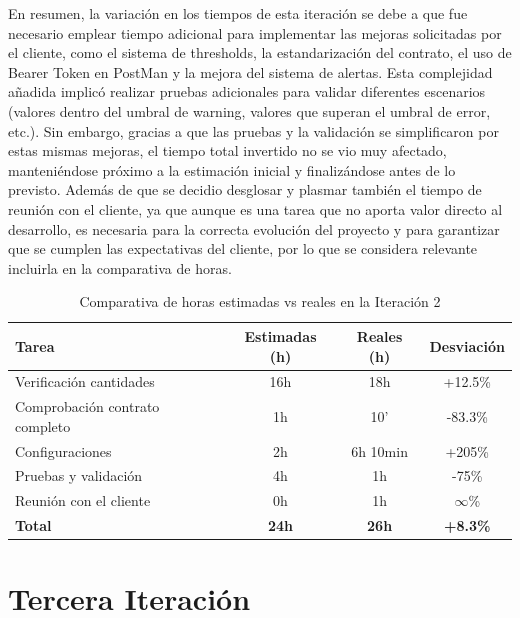 En resumen, la variación en los tiempos de esta iteración se debe a que fue necesario emplear tiempo adicional para implementar las mejoras solicitadas por el cliente, como el sistema de thresholds, la estandarización del contrato, el uso de Bearer Token en PostMan y la mejora del sistema de alertas. Esta complejidad añadida implicó realizar pruebas adicionales para validar diferentes escenarios (valores dentro del umbral de warning, valores que superan el umbral de error, etc.). Sin embargo, gracias a que las pruebas y la validación se simplificaron por estas mismas mejoras, el tiempo total invertido no se vio muy afectado, manteniéndose próximo a la estimación inicial y finalizándose antes de lo previsto.
Además de que se decidio desglosar y plasmar también el tiempo de reunión con el cliente, ya que aunque es una tarea que no aporta valor directo al desarrollo, es necesaria para la correcta evolución del proyecto y para garantizar que se cumplen las expectativas del cliente, por lo que se considera relevante incluirla en la comparativa de horas.

\begin{table}[H]
    \centering
    \begin{tabular}{|l|c|c|c|}
        \hline
        \textbf{Tarea} & \textbf{Estimadas (h)} & \textbf{Reales (h)} & \textbf{Desviación}\\
        \hline
        Verificación cantidades & 16h & 18h & +12.5\% \\
        Comprobación contrato completo & 1h & 10' & -83.3\% \\
        Configuraciones & 2h & 6h 10min & +205\% \\
        Pruebas y validación & 4h & 1h & -75\% \\
        Reunión con el cliente & 0h & 1h & $\infty$\% \\
        \hline
        \textbf{Total} & \textbf{24h} & \textbf{26h} & \textbf{+8.3\%} \\
        \hline
    \end{tabular}
    \caption{Comparativa de horas estimadas vs reales en la Iteración 2}
    \label{tab:horas-iteracion2}
\end{table}

\section{Tercera Iteración}

